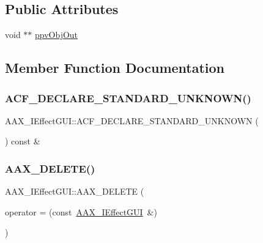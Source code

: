 \subsection*{Public Attributes}
\begin{DoxyCompactItemize}
\item 
void $\ast$$\ast$ \mbox{\hyperlink{a01821_afcb1be35487e2a63f50ef2bc56f74c3a}{ppv\+Obj\+Out}}
\end{DoxyCompactItemize}


\subsection{Member Function Documentation}
\mbox{\label{a01821_a8b48b2f7798aa1ad2ebb38a93ad409b9}} 
\subsubsection{\texorpdfstring{ACF\_DECLARE\_STANDARD\_UNKNOWN()}{ACF\_DECLARE\_STANDARD\_UNKNOWN()}}
{\footnotesize\ttfamily A\+A\+X\+\_\+\+I\+Effect\+G\+U\+I\+::\+A\+C\+F\+\_\+\+D\+E\+C\+L\+A\+R\+E\+\_\+\+S\+T\+A\+N\+D\+A\+R\+D\+\_\+\+U\+N\+K\+N\+O\+WN (\begin{DoxyParamCaption}{ }\end{DoxyParamCaption}) const \&}

\mbox{\label{a01821_abee8b669ca6136a80364127f144d24c3}} 
\subsubsection{\texorpdfstring{AAX\_DELETE()}{AAX\_DELETE()}}
{\footnotesize\ttfamily A\+A\+X\+\_\+\+I\+Effect\+G\+U\+I\+::\+A\+A\+X\+\_\+\+D\+E\+L\+E\+TE (\begin{DoxyParamCaption}\item[{\mbox{\hyperlink{a01821}{A\+A\+X\+\_\+\+I\+Effect\+G\+UI}} \&}]{operator = {\ttfamily (const~\mbox{\hyperlink{a01821}{A\+A\+X\+\_\+\+I\+Effect\+G\+UI}}~\&)} }\end{DoxyParamCaption})}



